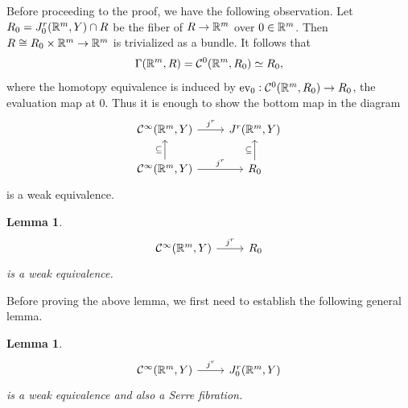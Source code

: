 \documentclass{article}
\newtheorem{lemma}[theorem]{Lemma}
\newtheorem{proposed work}[theorem]{Proposed Work}
\theoremstyle{definition}
\begin{document}
Before proceeding to the proof, we have the following observation. Let
$R_0 = J_0^r(\mathbb R^m,Y) \cap R$ be the fiber of $R \to \mathbb R^m$ over
$0 \in \mathbb R^m$. Then $R \cong R_0 \times \mathbb R^m \to \mathbb R^m$ is trivialized
as a bundle. It follows that
\begin{equation*}
\Gamma(\mathbb R^m,R) = \mathcal C^0(\mathbb R^m, R_0) \simeq R_0,
\end{equation*}
where the homotopy equivalence is induced by
$\mathrm{ev}_0: \mathcal C^0(\mathbb R^m, R_0) \to R_0$, the evaluation map at
$0$. Thus it is enough to show the bottom map in the diagram
\begin{equation*}
\begin{tikzcd}
\cC^\infty(\R^m,Y) \ar[r,"j^r"] & J^r(\R^m,Y) \\
\cC^\infty(\R^m,Y) \ar[u, "\subseteq"] \ar[r, "j^r"] & R_0 \ar[u, "\subseteq"]
\end{tikzcd}
\end{equation*}
is a weak equivalence.

\begin{lemma}
\label{hlocallemma1}
\begin{equation*}
\begin{tikzcd}
\cC^\infty(\R^m,Y)\ar[r, "j^r"] & R_0
\end{tikzcd}
\end{equation*}
is a weak equivalence.
\end{lemma}

Before proving the above lemma, we first need to establish the
following general lemma.

\begin{lemma}
\label{hlocallemma2}
\begin{equation*}
\begin{tikzcd}
\cC^\infty(\R^m,Y) \ar[r,"j^r"] & J_0^r(\R^m,Y)
\end{tikzcd}
\end{equation*}
is a weak equivalence and also a Serre fibration.
\end{lemma}
\end{document}
